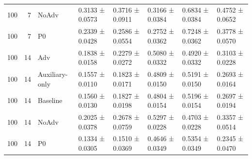 \begin{table}
\begin{tabular}{rrllllll}
100 & 7 & NoAdv & 0.3133 ± 0.0573 & 0.3716 ± 0.0911 & 0.3166 ± 0.0384 & 0.6834 ± 0.0384 & 0.4752 ± 0.0652 \\
100 & 7 & P0 & 0.2339 ± 0.0428 & 0.2586 ± 0.0554 & 0.2752 ± 0.0362 & 0.7248 ± 0.0362 & 0.3778 ± 0.0570 \\
100 & 14 & Adv & 0.1838 ± 0.0158 & 0.2279 ± 0.0272 & 0.5080 ± 0.0332 & 0.4920 ± 0.0332 & 0.3103 ± 0.0228 \\
100 & 14 & Auxiliary-only & 0.1557 ± 0.0110 & 0.1823 ± 0.0171 & 0.4809 ± 0.0150 & 0.5191 ± 0.0150 & 0.2693 ± 0.0164 \\
100 & 14 & Baseline & 0.1560 ± 0.0130 & 0.1827 ± 0.0198 & 0.4804 ± 0.0154 & 0.5196 ± 0.0154 & 0.2697 ± 0.0194 \\
100 & 14 & NoAdv & 0.2025 ± 0.0378 & 0.2678 ± 0.0759 & 0.5297 ± 0.0228 & 0.4703 ± 0.0228 & 0.3357 ± 0.0514 \\
100 & 14 & P0 & 0.1334 ± 0.0305 & 0.1510 ± 0.0369 & 0.4646 ± 0.0349 & 0.5354 ± 0.0349 & 0.2345 ± 0.0470 \\
\bottomrule
\end{tabular}
\end{table}
